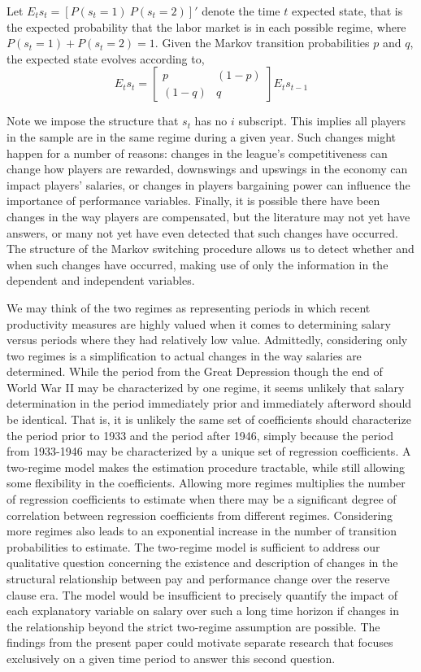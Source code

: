 \documentclass[12pt]{article}
\newcommand{\bdm}{\begin{displaymath}}
\newcommand{\edm}{\end{displaymath}}
\begin{document}
Let $E_t s_t = [P(s_t=1)~ P(s_t=2)]'$ denote the time $t$ expected state, that is the expected probability that the labor market is in each possible regime, where $P(s_t=1)+P(s_t=2)=1$.  Given the Markov transition probabilities $p$ and $q$, the expected state evolves according to,
\bdm E_t s_t = \left[ \begin{array}{cc} p & (1-p) \\ (1-q) & q \end{array} \right] E_{t} s_{t-1} \edm

Note we impose the structure that $s_t$ has no $i$ subscript.  This implies all players in the sample are in the same regime during a given year.  Such changes might happen for a number of reasons: changes in the league's competitiveness can change how players are rewarded, downswings and upswings in the economy can impact players' salaries, or changes in players bargaining power can influence the importance of performance variables.  Finally, it is possible there have been changes in the way players are compensated, but the literature may not yet have answers, or many not yet have even detected that such changes have occurred.  The structure of the Markov switching procedure allows us to detect whether and when such changes have occurred, making use of only the information in the dependent and independent variables.

We may think of the two regimes as representing periods in which recent productivity measures are highly valued when it comes to determining salary versus periods where they had relatively low value.  Admittedly, considering only two regimes is a simplification to actual changes in the way salaries are determined.  While the period from the Great Depression though the end of World War II may be characterized by one regime, it seems unlikely that salary determination in the period immediately prior and immediately afterword should be identical.  That is, it is unlikely the same set of coefficients should characterize the period prior to 1933 and the period after 1946, simply because the period from 1933-1946 may be characterized by a unique set of regression coefficients.  A two-regime model makes the estimation procedure tractable, while still allowing some flexibility in the coefficients.  Allowing more regimes multiplies the number of regression coefficients to estimate when there may be a significant degree of correlation between regression coefficients from different regimes.  Considering more regimes also leads to an exponential increase in the number of transition probabilities to estimate.  The two-regime model is sufficient to address our qualitative question concerning the existence and description of changes in the structural relationship between pay and performance change over the reserve clause era.  The model would be insufficient to precisely quantify the impact of each explanatory variable on salary over such a long time horizon if changes in the relationship beyond the strict two-regime assumption are possible.  The findings from the present paper could motivate separate research that focuses exclusively on a given time period to answer this second question.
\end{document}
